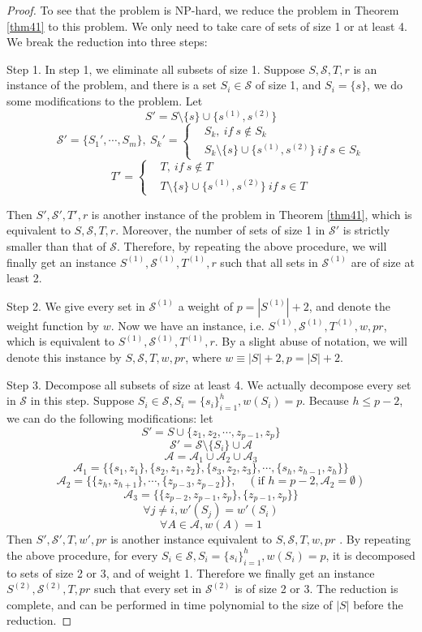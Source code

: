 \documentclass[10pt,a4paper]{amsart}
\newcommand{\mc}[1]{\mathcal{#1}}
\newcommand{\rs}{\setminus}
\begin{document}
	\begin{proof}
		To see that the problem is NP-hard, we reduce the problem in Theorem \ref{thm41} to this problem. We only need to take care of sets of size 1 or at least 4. We break the reduction into three steps: \par
		Step 1. In step 1, we eliminate all subsets of size 1. Suppose $S,\mc{S},T,r$ is an instance of the problem, and there is a set $S_i\in\mc{S}$ of size 1, and $S_i=\{s\}$, we do some modifications to the problem. Let
		$$S'=S\rs\{s\}\cup\{s^{(1)},s^{(2)}\}$$ 
		$$\mc{S}'=\{S_1',\cdots,S_m\},\ 
		S_k'=\left\{
		\begin{aligned}
			&S_k,\ if\ s\notin S_k \\
			&S_k\rs\{s\}\cup\{s^{(1)},s^{(2)}\}\ if\ s\in S_k
		\end{aligned}
		\right.
		$$
		$$T'=\left\{
		\begin{aligned}
			&T,\ if\ s\notin T \\
			&T\rs\{s\}\cup\{s^{(1)},s^{(2)}\}\ if\ s\in T
		\end{aligned}
		\right.
		$$ \par
		Then $S',\mc{S}',T',r$ is another instance of the problem in Theorem \ref{thm41}, which is equivalent to $S,\mc{S},T,r$. Moreover, the number of sets of size 1 in $\mc{S}'$ is strictly smaller than that of $\mc{S}$. Therefore, by repeating the above procedure, we will finally get an instance $S^{(1)},\mc{S}^{(1)},T^{(1)},r$ such that all sets in $\mc{S}^{(1)}$ are of size at least 2. \par
		Step 2. We give every set in $\mc{S}^{(1)}$ a weight of $p=|S^{(1)}|+2$, and denote the weight function by $w$. Now we have an instance, i.e. $S^{(1)},\mc{S}^{(1)},T^{(1)},w,pr$, which is equivalent to $S^{(1)},\mc{S}^{(1)},T^{(1)},r$. By a slight abuse of notation, we will denote this instance by $S,\mc{S},T,w,pr$, where $w\equiv|S|+2,p=|S|+2$.\par 
		Step 3. Decompose all subsets of size at least 4. We actually decompose every set in $\mc{S}$ in this step. Suppose $S_i\in\mc{S},S_i=\{s_i\}_{i=1}^h,w(S_i)=p$. Because $h\leq p-2$, we can do the following modifications: let
		$$S'=S\cup\{z_1,z_2,\cdots,z_{p-1},z_p\}$$
		$$\mc{S}'=\mc{S}\rs\{S_i\}\cup\mc{A}$$
		$$\mc{A}=\mc{A}_1\cup\mc{A}_2\cup\mc{A}_3$$
		$$\mc{A}_1=\{\{s_1,z_1\},\{s_2,z_1,z_2\},\{s_3,z_2,z_3\},\cdots,\{s_h,z_{h-1},z_h\}\}$$
		$$\mc{A}_2=\{\{z_h,z_{h+1}\},\cdots,\{z_{p-3},z_{p-2}\}\},\quad (\text{if }h=p-2,\mc{A}_2=\emptyset)$$
		$$\mc{A}_3=\{\{z_{p-2},z_{p-1},z_p\},\{z_{p-1},z_p\}\}$$
		$$\forall j\neq i, w'(S_j)=w'(S_i)$$
		$$\forall A\in\mc{A},w(A)=1$$
		Then $S',\mc{S}',T,w',pr$ is another instance equivalent to $S,\mc{S},T,w,pr$ . By repeating the above procedure, for every $S_i\in\mc{S},S_i=\{s_i\}_{i=1}^h,w(S_i)=p$, it is decomposed to sets of size 2 or 3, and of weight 1. Therefore we finally get an instance $S^{(2)},\mc{S}^{(2)},T,pr$ such that every set in $\mc{S}^{(2)}$ is of size 2 or 3. The reduction is complete, and can be performed in time polynomial to the size of $|S|$ before the reduction.
	\end{proof}
\end{document}
